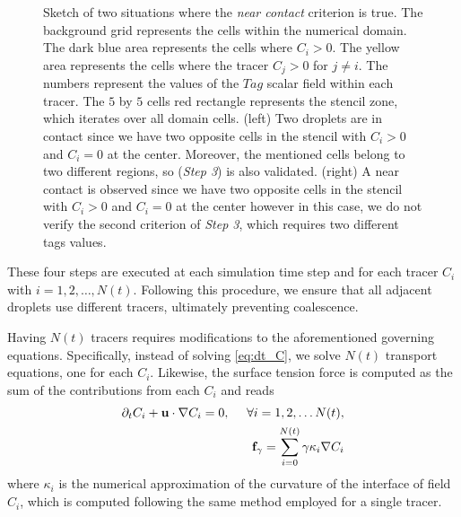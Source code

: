 \documentclass[11pt]{My_preprint}
\begin{document}
\begin{figure}
    \caption{Sketch of two situations where the \textit{near contact} criterion is true. 
    The background grid represents the cells within the numerical domain. 
    The dark blue area represents the cells where $C_i > 0$.
    The yellow area represents the cells where the tracer $C_j > 0$ for $j\neq i$. 
    The numbers represent the values of the $Tag$ scalar field within each tracer.
    The $5$ by $5$ cells red rectangle represents the stencil zone, which iterates over all domain cells.  
(left) Two droplets are in contact since we have two opposite cells in the stencil with $C_i > 0$ and $C_i=0$ at the center.
    Moreover, the mentioned cells belong to two different regions, so (\textit{Step 3}) is also validated.  
    (right) A near contact is observed since we have two opposite cells in the stencil with $C_i > 0$ and $C_i=0$ at the center however in this case, we do not verify the second criterion of \textit{Step 3}, which requires two different tags values. 
    }
    \label{fig:criterion}
\end{figure}
These four steps are executed at each simulation time step and for each tracer $C_i$ with $i = 1, 2, \ldots, N(t)$.
Following this procedure, we ensure that all adjacent droplets use different tracers, ultimately preventing coalescence. 

Having $N(t)$ tracers requires modifications to the aforementioned governing equations. 
Specifically, instead of solving \ref{eq:dt_C}, we solve $N(t)$ transport equations, one for each $C_i$.
Likewise, the surface tension force is computed as the sum of the contributions from each $C_i$ and reads
\begin{align*}
    \partial_t C_i + \textbf{u}\cdot\mathbf{\nabla} C_i = 0,
    \ \  \ \ \forall i = 1,2,\ldots N(t),\\
    \textbf{f}_\gamma 
    = \sum_{i=0}^{N(t)} \gamma \kappa_i \mathbf{\nabla} C_i
\end{align*}
where $\kappa_i$ is the numerical approximation of the curvature of the interface of field $C_i$, which is computed following the same method employed for a single tracer. 
\end{document}
